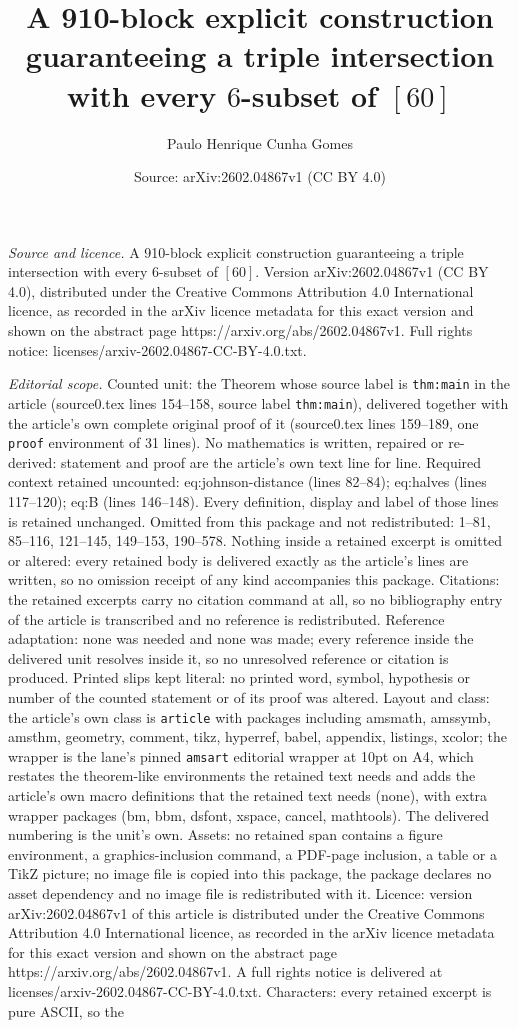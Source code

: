 \documentclass[10pt,a4paper]{amsart}
\title[A 910-block explicit construction guaranteeing a triple inte]{A 910-block explicit construction guaranteeing a triple intersection with every $6$-subset of $[60]$}
\author{Paulo Henrique Cunha Gomes}
\date{Source: arXiv:2602.04867v1 (CC BY 4.0)}
\begin{document}
\maketitle

\noindent\emph{Source and licence.} A 910-block explicit construction guaranteeing a triple intersection with every $6$-subset of $[60]$. Version arXiv:2602.04867v1 (CC BY 4.0), distributed under the Creative Commons Attribution 4.0 International licence, as recorded in the arXiv licence metadata for this exact version and shown on the abstract page https://arxiv.org/abs/2602.04867v1. Full rights notice: licenses/arxiv-2602.04867-CC-BY-4.0.txt.\par\smallskip

\noindent\textit{Editorial scope.} Counted unit: the Theorem whose source label is \texttt{thm:main} in the article (source0.tex lines 154--158, source label \texttt{thm:main}), delivered together with the article's own complete original proof of it (source0.tex lines 159--189, one \texttt{proof} environment of 31 lines). No mathematics is written, repaired or re-derived: statement and proof are the article's own text line for line. Required context retained uncounted: eq:johnson-distance (lines 82--84); eq:halves (lines 117--120); eq:B (lines 146--148). Every definition, display and label of those lines is retained unchanged. Omitted from this package and not redistributed: 1--81, 85--116, 121--145, 149--153, 190--578. Nothing inside a retained excerpt is omitted or altered: every retained body is delivered exactly as the article's lines are written, so no omission receipt of any kind accompanies this package. Citations: the retained excerpts carry no citation command at all, so no bibliography entry of the article is transcribed and no reference is redistributed. Reference adaptation: none was needed and none was made; every reference inside the delivered unit resolves inside it, so no unresolved reference or citation is produced. Printed slips kept literal: no printed word, symbol, hypothesis or number of the counted statement or of its proof was altered. Layout and class: the article's own class is \texttt{article} with packages including amsmath, amssymb, amsthm, geometry, comment, tikz, hyperref, babel, appendix, listings, xcolor; the wrapper is the lane's pinned \texttt{amsart} editorial wrapper at 10pt on A4, which restates the theorem-like environments the retained text needs and adds the article's own macro definitions that the retained text needs (none), with extra wrapper packages (bm, bbm, dsfont, xspace, cancel, mathtools). The delivered numbering is the unit's own. Assets: no retained span contains a figure environment, a graphics-inclusion command, a PDF-page inclusion, a table or a TikZ picture; no image file is copied into this package, the package declares no asset dependency and no image file is redistributed with it. Licence: version arXiv:2602.04867v1 of this article is distributed under the Creative Commons Attribution 4.0 International licence, as recorded in the arXiv licence metadata for this exact version and shown on the abstract page https://arxiv.org/abs/2602.04867v1. A full rights notice is delivered at licenses/arxiv-2602.04867-CC-BY-4.0.txt. Characters: every retained excerpt is pure ASCII, so the 
\end{document}
